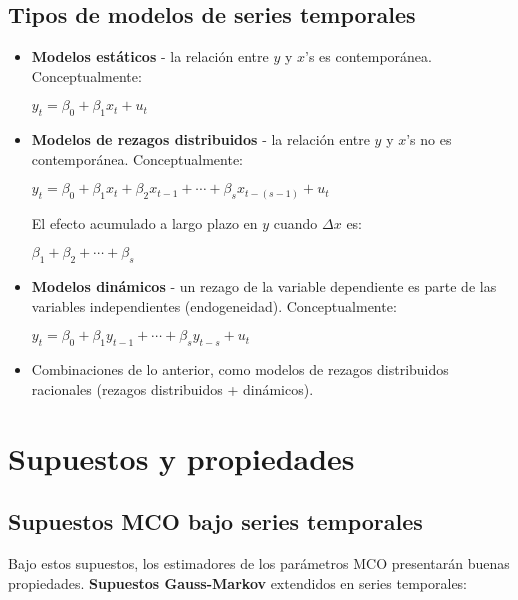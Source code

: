 \documentclass[10pt, a4paper, landscape]{extarticle}
\begin{document}
\begin{multicols}{3}
\subsection*{Tipos de modelos de series temporales}

\begin{itemize}[leftmargin=*]
	\item \textbf{Modelos estáticos} - la relación entre $y$ y $x$'s es contemporánea. Conceptualmente:
	\begin{center}
		$y_t = \beta_0 + \beta_1 x_t + u_t$
	\end{center}
	\item \textbf{Modelos de rezagos distribuidos} - la relación entre $y$ y $x$'s no es contemporánea. Conceptualmente:
	\begin{center}
		$y_t = \beta_0 + \beta_1 x_t + \beta_2 x_{t - 1} + \cdots + \beta_{s} x_{t - (s - 1)} + u_t$
	\end{center}
	El efecto acumulado a largo plazo en $y$ cuando $\Delta x$ es:
	\begin{center}
	 	$\beta_1 + \beta_2 + \cdots + \beta_{s}$
	\end{center}
 	\item \textbf{Modelos dinámicos} - un rezago de la variable dependiente es parte de las variables independientes (endogeneidad). Conceptualmente:
 	\begin{center}
 		$y_t = \beta_0 + \beta_1 y_{t - 1} + \cdots + \beta_s y_{t - s} + u_t$
 	\end{center}
	 \item Combinaciones de lo anterior, como modelos de rezagos distribuidos racionales (rezagos distribuidos + dinámicos).
\end{itemize}

\columnbreak

\section*{Supuestos y propiedades}

\subsection*{Supuestos MCO bajo series temporales}

Bajo estos supuestos, los estimadores de los parámetros MCO presentarán buenas propiedades. \textbf{Supuestos Gauss-Markov} extendidos en series temporales:


\end{multicols}
\end{document}
